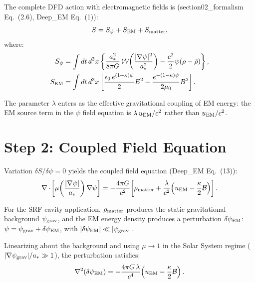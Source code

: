 \documentclass[11pt]{article}
\newcommand{\calB}{\mathcal{B}}
\theoremstyle{definition}
\theoremstyle{remark}
\begin{document}
The complete DFD action with electromagnetic fields is
(section02\_formalism Eq.~(2.6), Deep\_EM Eq.~(1)):
\begin{equation}
S = S_\psi + S_{\rm EM} + S_{\rm matter},
\label{eq:action-full}
\end{equation}
where:
\begin{align}
S_\psi &= \int dt\,d^3x\left\{
  \frac{a_*^2}{8\pi G}\,\mathcal{W}\!\left(\frac{|\nabla\psi|^2}
  {a_*^2}\right) - \frac{c^2}{2}\psi(\rho - \bar{\rho})
\right\}, \\
S_{\rm EM} &= \int dt\,d^3x\left[
  \frac{\epsilon_0\,e^{(1+\kappa)\psi}}{2}E^2
  - \frac{e^{-(1-\kappa)\psi}}{2\mu_0}B^2
\right].
\end{align}

The parameter $\lambda$ enters as the effective gravitational coupling
of EM energy: the EM source term in the $\psi$ field equation is
$\lambda\,u_{\rm EM}/c^2$ rather than $u_{\rm EM}/c^2$.


\section{Step 2: Coupled Field Equation}
\label{sec:step2}

Variation $\delta S/\delta\psi = 0$ yields the coupled field equation
(Deep\_EM Eq.~(13)):
\begin{equation}
\nabla\cdot\!\left[\mu\!\left(\frac{|\nabla\psi|}{a_*}\right)
\nabla\psi\right] =
-\frac{4\pi G}{c^2}\!\left[
  \rho_{\rm matter}
  + \frac{\lambda}{c^2}\!\left(u_{\rm EM} - \frac{\kappa}{2}\calB
  \right)
\right].
\label{eq:field-coupled}
\end{equation}

For the SRF cavity application, $\rho_{\rm matter}$ produces the
static gravitational background $\psi_{\rm grav}$, and the EM energy
density produces a perturbation $\delta\psi_{\rm EM}$:
$\psi = \psi_{\rm grav} + \delta\psi_{\rm EM}$, with
$|\delta\psi_{\rm EM}| \ll |\psi_{\rm grav}|$.

Linearizing about the background and using $\mu \to 1$ in the
Solar System regime ($|\nabla\psi_{\rm grav}|/a_* \gg 1$), the
perturbation satisfies:
\begin{equation}
\nabla^2(\delta\psi_{\rm EM}) =
-\frac{4\pi G\,\lambda}{c^4}\!\left(u_{\rm EM}
  - \frac{\kappa}{2}\calB\right).
\label{eq:linearized}
\end{equation}
\end{document}
